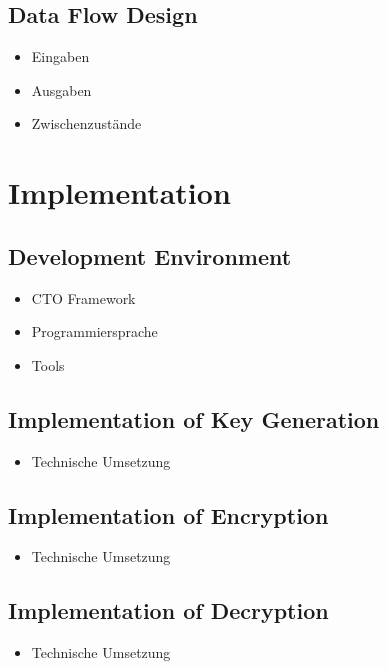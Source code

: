 \documentclass[a4paper,11pt]{article}
\begin{document}
\subsection{Data Flow Design}
\begin{itemize}
	\item Eingaben
	\item Ausgaben
	\item Zwischenzustände
\end{itemize}

\section{Implementation}

\subsection{Development Environment}
\begin{itemize}
	\item CTO Framework
	\item Programmiersprache
	\item Tools
\end{itemize}

\subsection{Implementation of Key Generation}
\begin{itemize}
	\item Technische Umsetzung
\end{itemize}

\subsection{Implementation of Encryption}
\begin{itemize}
	\item Technische Umsetzung
\end{itemize}

\subsection{Implementation of Decryption}
\begin{itemize}
	\item Technische Umsetzung
\end{itemize}
\end{document}
